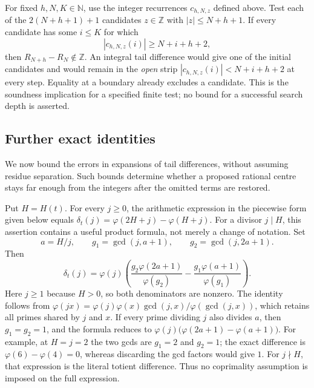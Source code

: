 \begin{prop}\label{prop:B12cons}
For fixed $h,N,K\in\mathbb N$, use the integer recurrences
$c_{h,N,z}$ defined above. Test each of the $2(N+h+1)+1$ candidates
$z\in\mathbb Z$ with $|z|\le N+h+1$. If every candidate has some
$i\le K$ for which
\[
 |c_{h,N,z}(i)|\ge N+i+h+2,
\]
then $R_{N+h}-R_N\notin\mathbb Z$.
An integral tail difference would give one of the initial candidates
and would remain in the \emph{open} strip
$|c_{h,N,z}(i)|<N+i+h+2$ at every step. Equality at a boundary already
excludes a candidate. This is the soundness implication for a specified
finite test; no bound for a successful search depth is asserted.

\end{prop}

\subsection{Further exact identities}

We now bound the errors in expansions of tail differences, without
assuming residue separation. Such bounds determine whether a
proposed rational centre stays far enough from the integers after
the omitted terms are restored.

\begin{prop}\label{prop:AR-04-inv}
Put $H=H(t)$. For every $j\ge0$, the arithmetic expression in the piecewise form given below equals $\delta_t(j)=\varphi(2H+j)-\varphi(H+j)$.
For a divisor $j\mid H$, this assertion contains a useful product
formula, not merely a change of notation. Set
\[
 a=H/j,\qquad g_1=\gcd(j,a+1),\qquad g_2=\gcd(j,2a+1).
\]
Then
\[
 \delta_t(j)=\varphi(j)\left(
 \frac{g_2\varphi(2a+1)}{\varphi(g_2)}
 -\frac{g_1\varphi(a+1)}{\varphi(g_1)}\right).
\]
Here $j\ge1$ because $H>0$, so both denominators are nonzero.
The identity follows from
$\varphi(jx)=\varphi(j)\varphi(x)\gcd(j,x)/\varphi(\gcd(j,x))$,
which retains all primes shared by $j$ and $x$.
If every prime dividing $j$ also divides $a$, then $g_1=g_2=1$,
and the formula reduces to
$\varphi(j)\bigl(\varphi(2a+1)-\varphi(a+1)\bigr)$.
For example, at $H=j=2$ the two gcds are $g_1=2$ and $g_2=1$;
the exact difference is $\varphi(6)-\varphi(4)=0$, whereas discarding
the gcd factors would give $1$.
For $j\nmid H$, that expression is the literal totient difference.
Thus no coprimality assumption is imposed on the full expression.

\end{prop}

